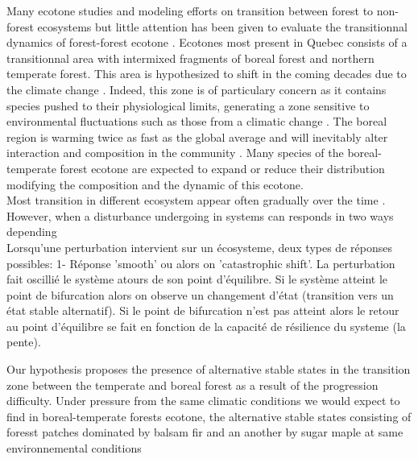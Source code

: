 
Many ecotone studies and modeling efforts on transition between forest to non-forest ecosystems \cite{Scheffer2012,Scheffer2001,Hirota2011} but little attention has been given to evaluate the transitionnal dynamics of forest-forest ecotone \cite{Goldblum2010,Graignic2013}. Ecotones most present in Quebec consists of a transitionnal area with intermixed fragments of boreal forest and northern temperate forest\cite{Goldblum2010}. This area is hypothesized to shift in the coming decades due to the climate change \cite{Scheffer2012}. Indeed, this zone is of particulary concern as it contains species pushed to their physiological limits, generating a zone sensitive to environmental fluctuations such as those from a climatic change \cite{Messaoud2007,Goldblum2010}. The boreal region is warming twice as fast as the global average and will inevitably alter interaction and composition in the community \cite{Scheffer2012,Hughes2000}. Many species of the boreal-temperate forest ecotone are expected to expand or reduce their distribution \cite{Graignic2013,Goldblum2005,Hughes2000} modifying the composition and the dynamic of this ecotone.\\


Most transition in different ecosystem appear often gradually over the time \cite{Scheffer2001,scheffer2009critical}. However, when a disturbance undergoing in systems can responds in two ways depending   \\

 Lorsqu'une perturbation intervient sur un écosysteme, deux types de réponses possibles: 1- Réponse 'smooth' ou alors on 'catastrophic shift'. La perturbation fait oscillié le système atours de son point d'équilibre. Si le système atteint le point de bifurcation alors on observe un changement d'état (transition vers un état stable alternatif). Si le point de bifurcation n'est pas atteint alors le retour au point d'équilibre se fait en fonction de la capacité de résilience du systeme (la pente).  

Our hypothesis proposes the presence of alternative stable states in the transition zone between the temperate and boreal forest as a result of the progression difficulty. Under pressure from the same climatic conditions we would expect to find in boreal-temperate forests ecotone, the alternative stable states consisting of foresst patches dominated by balsam fir and an another by sugar maple at same environnemental conditions\\ 

